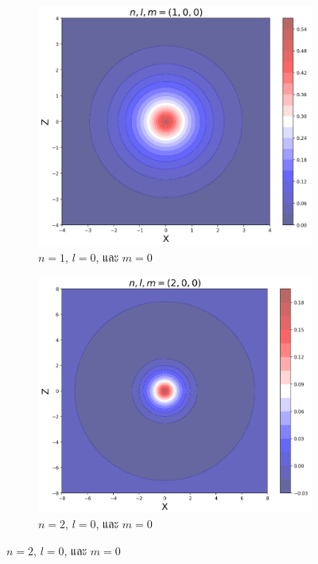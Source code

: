 \begin{figure}[H]
    \centering
    \begin{subfigure}{0.5\textwidth}
        \centering
        \includegraphics[width=0.9\linewidth]{fig/wfn_hydro_n1_l0_m0.png}
        \caption{$n = 1$, $l = 0$, และ $m = 0$}
        \label{fig:wfn_hydro_n1_l0_m0}
    \end{subfigure}%
    \begin{subfigure}{0.5\textwidth}
        \centering
        \includegraphics[width=0.9\linewidth]{fig/wfn_hydro_n2_l0_m0.png}
        \caption{$n = 2$, $l = 0$, และ $m = 0$}
        \label{fig:wfn_hydro_n2_l0_m0}
    \end{subfigure}

\end{figure}
